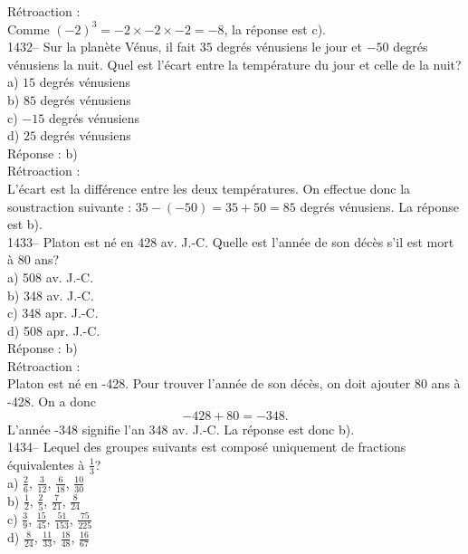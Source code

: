 R\'etroaction :\\
Comme $(-2)^3=-2\times-2\times-2=-8$, la r\'eponse est c).\\

1432-- Sur la plan\`ete V\'enus, il fait  $35$ degr\'es v\'enusiens le
jour et $-50$ degr\'es v\'enusiens la
nuit. Quel est l'\'ecart entre la temp\'erature du jour et celle de la
nuit?\\
a) $15$ degr\'es v\'enusiens\\
b) $85$ degr\'es v\'enusiens\\
c) $-15$ degr\'es v\'enusiens\\
d) $25$ degr\'es v\'enusiens\\

R\'eponse : b)\\

R\'etroaction :\\
L'\'ecart est la diff\'erence entre les deux temp\'eratures. On
effectue donc la soustraction suivante : $35-(-50)=35+50=85$
degr\'es v\'enusiens. La r\'eponse est b).\\

1433-- Platon est n\'e en 428 av. J.-C. Quelle est l'ann\'ee de son
d\'ec\`es s'il est mort \`a 80 ans?\\
a) 508 av. J.-C.\\
b) 348 av. J.-C.\\
c) 348 apr. J.-C.\\
d) 508 apr. J.-C.\\

R\'eponse : b)\\

R\'etroaction :\\
Platon est n\'e en -428. Pour trouver l'ann\'ee de son d\'ec\`es, on
doit ajouter 80 ans \`a -428. On a donc $$-428+80=-348.$$ L'ann\'ee
-348 signifie l'an 348 av. J.-C. La r\'eponse est donc
b).\\

1434-- Lequel des groupes suivants est compos\'e uniquement de
fractions
\'equivalentes \`a $\frac{1}{3}$?\\[3mm]
a) $\frac{2}{6}$,  $\frac{3}{12}$,  $\frac{6}{18}$,  $\frac{10}{30}$\\[3mm]
b) $\frac{1}{2}$,  $\frac{2}{5}$,   $\frac{7}{21}$,  $\frac{8}{24}$\\[3mm]
c) $\frac{3}{9}$,   $\frac{15}{45}$,  $\frac{51}{153}$,
$\frac{75}{225}$\\[3mm]
d) $\frac{8}{24}$,  $\frac{11}{33}$,   $\frac{18}{48}$,  $\frac{16}{67}$\\

